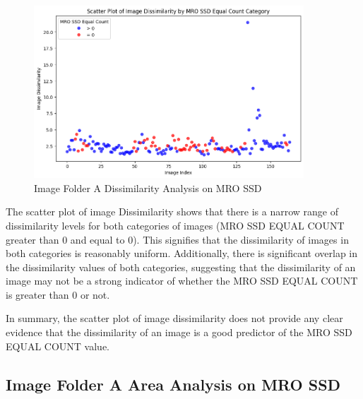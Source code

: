 \begin{figure}[ht]
    \centering
    \includegraphics[width=0.9\textwidth]{Figures/Results/sipa_02/dissimilarity.png}
    \caption[Image Folder A Dissimilarity Analysis on MRO SSD]{Image Folder A Dissimilarity Analysis on MRO SSD}
    \label{fig:Image Folder A Dissimilarity Analysis on MRO SSD}
\end{figure}



The scatter plot of image Dissimilarity shows that there is a narrow range of dissimilarity levels for both categories of images (MRO SSD EQUAL COUNT greater than 0 and equal to 0). This signifies that the dissimilarity of images in both categories is reasonably uniform. Additionally, there is significant overlap in the dissimilarity values of both categories, suggesting that the dissimilarity of an image may not be a strong indicator of whether the MRO SSD EQUAL COUNT is greater than 0 or not.

In summary, the scatter plot of image dissimilarity does not provide any clear evidence that the dissimilarity of an image is a good predictor of the MRO SSD EQUAL COUNT value.


\newpage

\subsection{Image Folder A Area Analysis on MRO SSD}



